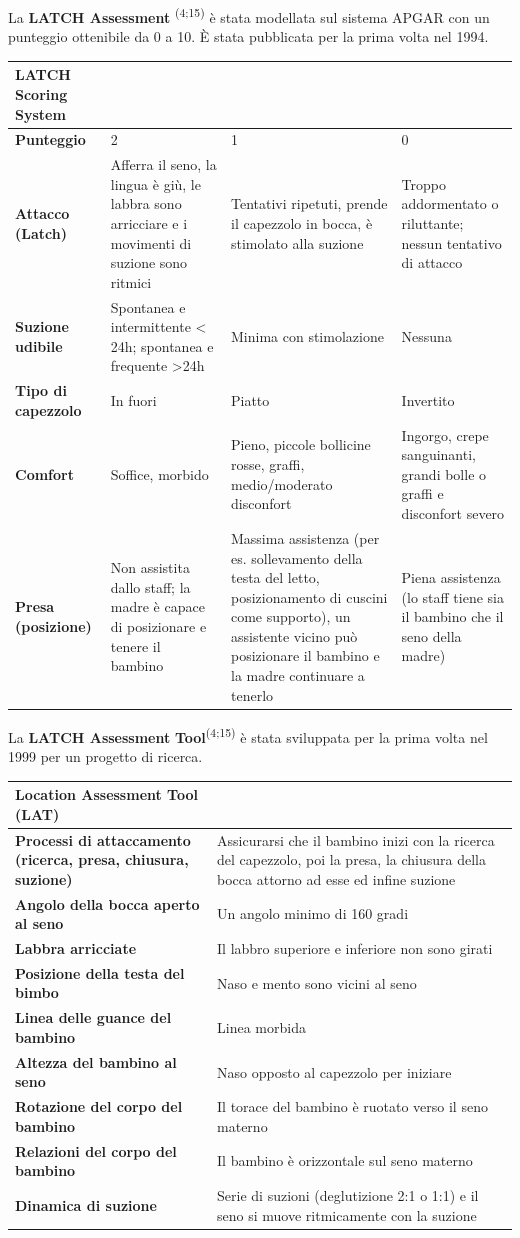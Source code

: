 \documentclass[]{article}
\begin{document}
La \textbf{LATCH Assessment} \textsuperscript{(4;15)} è stata modellata
sul sistema APGAR con un punteggio ottenibile da 0 a 10. È stata
pubblicata per la prima volta nel 1994.

\begin{longtable}[]{@{}llll@{}}
\toprule
\textbf{LATCH Scoring System} & & &\tabularnewline
\midrule
\endhead
\textbf{Punteggio} & 2 & 1 & 0\tabularnewline
\textbf{Attacco (Latch)} & Afferra il seno, la lingua è giù, le labbra
sono arricciare e i movimenti di suzione sono ritmici & Tentativi
ripetuti, prende il capezzolo in bocca, è stimolato alla suzione &
Troppo addormentato o riluttante; nessun tentativo di
attacco\tabularnewline
\textbf{Suzione udibile} & Spontanea e intermittente \textless{} 24h;
spontanea e frequente \textgreater{}24h & Minima con stimolazione &
Nessuna\tabularnewline
\textbf{Tipo di capezzolo} & In fuori & Piatto &
Invertito\tabularnewline
\textbf{Comfort} & Soffice, morbido & Pieno, piccole bollicine rosse,
graffi, medio/moderato disconfort & Ingorgo, crepe sanguinanti, grandi
bolle o graffi e disconfort severo\tabularnewline
\textbf{Presa (posizione)} & Non assistita dallo staff; la madre è
capace di posizionare e tenere il bambino & Massima assistenza (per es.
sollevamento della testa del letto, posizionamento di cuscini come
supporto), un assistente vicino può posizionare il bambino e la madre
continuare a tenerlo & Piena assistenza (lo staff tiene sia il bambino
che il seno della madre)\tabularnewline
\bottomrule
\end{longtable}

La \textbf{LATCH Assessment} \textbf{Tool}\textsuperscript{(4;15)} è
stata sviluppata per la prima volta nel 1999 per un progetto di ricerca.

\begin{longtable}[]{@{}ll@{}}
\toprule
\textbf{Location Assessment Tool (LAT)} &\tabularnewline
\midrule
\endhead
\textbf{Processi di attaccamento (ricerca, presa, chiusura, suzione)} &
Assicurarsi che il bambino inizi con la ricerca del capezzolo, poi la
presa, la chiusura della bocca attorno ad esse ed infine
suzione\tabularnewline
\textbf{Angolo della bocca aperto al seno} & Un angolo minimo di 160
gradi\tabularnewline
\textbf{Labbra arricciate } & Il labbro superiore e inferiore non sono
girati\tabularnewline
\textbf{Posizione della testa del bimbo } & Naso e mento sono vicini al
seno\tabularnewline
\textbf{Linea delle guance del bambino} & Linea morbida\tabularnewline
\textbf{Altezza del bambino al seno } & Naso opposto al capezzolo per
iniziare\tabularnewline
\textbf{Rotazione del corpo del bambino } & Il torace del bambino è
ruotato verso il seno materno\tabularnewline
\textbf{Relazioni del corpo del bambino } & Il bambino è orizzontale sul
seno materno\tabularnewline
\textbf{Dinamica di suzione } & Serie di suzioni (deglutizione 2:1 o
1:1) e il seno si muove ritmicamente con la suzione\tabularnewline
\bottomrule
\end{longtable}
\end{document}
